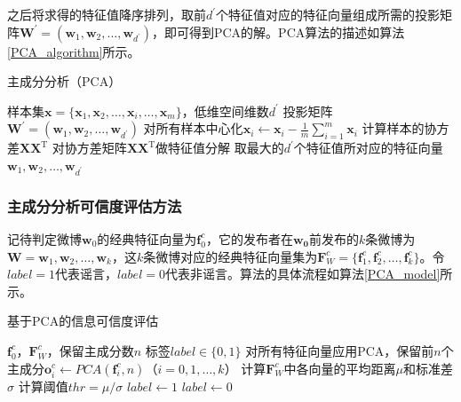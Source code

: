 \documentclass[a4paper,AutoFakeBold,oneside,12pt]{book}
\begin{document}
之后将求得的特征值降序排列，取前$d^\prime$个特征值对应的特征向量组成所需的投影矩阵$\bm{W}^\prime =(\bm{w}_1,\bm{w}_2,\ldots,\bm{w}_{d^\prime})$，即可得到PCA的解。PCA算法的描述如算法\ref{PCA_algorithm}所示。

\begin{algorithm} 
	\begin{spacing}{1.3}
		\caption{主成分分析（PCA）} 
		\label{PCA_algorithm}
		\renewcommand{\algorithmicrequire}{\textbf{输入：}}
		\renewcommand{\algorithmicensure}{\textbf{输出：}} 
		\begin{algorithmic}[1] 
			\Require 样本集$\bm{x}=\{\bm{x}_1,\bm{x}_2,\ldots,\bm{x}_i,\ldots,\bm{x}_m\}$，低维空间维数$d^\prime$ 
			\Ensure 投影矩阵  $\bm{W}^\prime =(\bm{w}_1,\bm{w}_2,\ldots,\bm{w}_{d^\prime})$
			\State 对所有样本中心化$\bm{x}_i \gets \bm{x}_i - \frac{1}{m}\sum_{i=1}^m \bm{x}_i$
			\State  计算样本的协方差$\bm{X}\bm{X}^ \mathrm{T}$
			\State 对协方差矩阵$\bm{X}\bm{X}^ \mathrm{T}$做特征值分解
			\State 取最大的$d^\prime$个特征值所对应的特征向量$\bm{w}_1,\bm{w}_2,\ldots,\bm{w}_{d^\prime}$
		\end{algorithmic}  
	\end{spacing}
\end{algorithm}

\subsubsection{主成分分析可信度评估方法}
记待判定微博$\bm{w}_0$的经典特征向量为$\bm{f}^{c}_{0}$，它的发布者在$\bm{w_0}$前发布的$k$条微博为$\bm{W} = \bm{w}_1,\bm{w}_2,\ldots,\bm{w}_k$，这$k$条微博对应的经典特征向量集为$\bm{F}^{c}_{W} = \{ \bm{f}^{c}_{1},\bm{f}^{c}_{2},\ldots,\bm{f}^{c}_{k} \}$。令$label = 1$代表谣言，$label = 0$代表非谣言。算法的具体流程如算法\ref{PCA_model}所示。

\begin{algorithm}
	\begin{spacing}{1.3}
		\caption{基于PCA的信息可信度评估} 
		\label{PCA_model}
		\renewcommand{\algorithmicrequire}{\textbf{输入：}}
		\renewcommand{\algorithmicensure}{\textbf{输出：}} 
			\begin{algorithmic}[1] 
				\Require $\bm{f}^{c}_{0}$，$\bm{F}^{c}_{W}$，保留主成分数$n$
				\Ensure 标签$label\in \{0,1\}$
				\State 对所有特征向量应用PCA，保留前$n$个主成分$\bm{o}^{c}_{i} \gets PCA(\bm{f}^{c}_{i}, n)$（$i = 0,1,\ldots,k$）
				\State 计算$\bm{F}^{c}_{W}$中各向量的平均距离$\mu$和标准差$\sigma$
				\State 计算阈值$thr = {\mu} / {\sigma}$
					\State $ label \gets 1 $
				\Else
					\State $ label \gets 0 $
				\EndIf
			\end{algorithmic}
	\end{spacing}
\end{algorithm}
\end{document}
